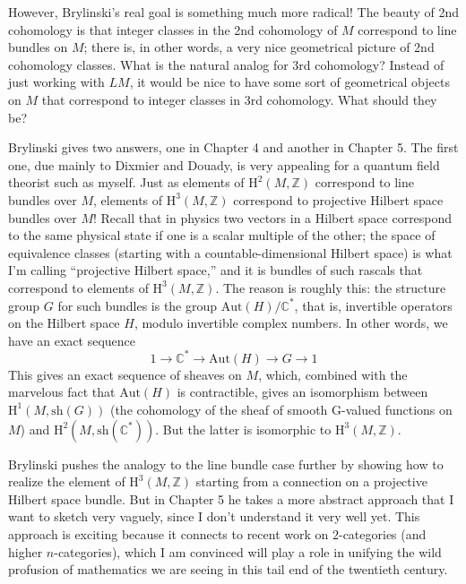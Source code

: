 \documentclass[12pt]{article}
\begin{document}
However, Brylinski's real goal is something much more radical! The
beauty of 2nd cohomology is that integer classes in the 2nd cohomology
of \(M\) correspond to line bundles on \(M\); there is, in other words,
a very nice geometrical picture of 2nd cohomology classes. What is the
natural analog for 3rd cohomology? Instead of just working with \(LM\),
it would be nice to have some sort of geometrical objects on \(M\) that
correspond to integer classes in 3rd cohomology. What should they be?

Brylinski gives two answers, one in Chapter 4 and another in Chapter 5.
The first one, due mainly to Dixmier and Douady, is very appealing for a
quantum field theorist such as myself. Just as elements of
\(\mathrm{H}^2(M,\mathbb{Z})\) correspond to line bundles over \(M\), elements of
\(\mathrm{H}^3(M,\mathbb{Z})\) correspond to projective Hilbert space bundles
over \(M\)! Recall that in physics two vectors in a Hilbert space
correspond to the same physical state if one is a scalar multiple of the
other; the space of equivalence classes (starting with a
countable-dimensional Hilbert space) is what I'm calling ``projective
Hilbert space,'' and it is bundles of such rascals that correspond to
elements of \(\mathrm{H}^3(M,\mathbb{Z})\). The reason is roughly this: the
structure group \(G\) for such bundles is the group
\(\mathrm{Aut}(H)/\mathbb{C}^*\), that is, invertible operators on the Hilbert
space \(H\), modulo invertible complex numbers. In other words, we have
an exact sequence 
\[1 \to \mathbb{C}^* \to \mathrm{Aut}(H) \to G \to 1\] 
This gives an exact sequence of sheaves on \(M\), which, combined with the
marvelous fact that \(\mathrm{Aut}(H)\) is contractible, gives an isomorphism
between \(\mathrm{H}^1(M,\mathrm{sh}(G))\) (the cohomology of the sheaf of smooth
G-valued functions on \(M\)) and \(\mathrm{H}^2(M,\mathrm{sh}(\mathbb{C}^*))\).
But the latter is isomorphic to \(\mathrm{H}^3(M,\mathbb{Z})\).

Brylinski pushes the analogy to the line bundle case further by showing
how to realize the element of \(\mathrm{H}^3(M,\mathbb{Z})\) starting from a
connection on a projective Hilbert space bundle. But in Chapter 5 he
takes a more abstract approach that I want to sketch very vaguely, since
I don't understand it very well yet. This approach is exciting because
it connects to recent work on \(2\)-categories (and higher
\(n\)-categories), which I am convinced will play a role in unifying the
wild profusion of mathematics we are seeing in this tail end of the
twentieth century.
\end{document}
